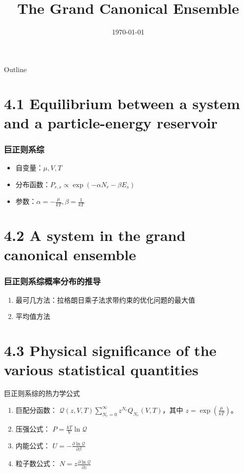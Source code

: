 \documentclass{ctexbeamer}
\title{The Grand Canonical Ensemble}
\date{\today}
\begin{document}
\begin{frame}
	\titlepage
\end{frame}
\begin{frame}{Outline}
    \tableofcontents
\end{frame}
\section{4.1 Equilibrium between 
a system and a particle-energy reservoir
}

\begin{frame}
\frametitle{巨正则系综}
\begin{itemize}
    \item 自变量：$\mu,V,T$
    \item 分布函数：$P_{r,s} \propto \exp(-\alpha N_r - \beta E_s)$
    \item 参数：$\alpha=-\frac{\mu}{kT}, \beta = \frac{1}{kT}$
\end{itemize}

\end{frame}
\section{4.2 A system in the grand canonical ensemble
}
\begin{frame}
    \frametitle{巨正则系综概率分布的推导}
    \begin{enumerate}
        \item 最可几方法：拉格朗日乘子法求带约束的优化问题的最大值
        \item 平均值方法
    \end{enumerate}
    
    \end{frame}
\section{4.3 Physical significance of the various
statistical quantities}
\begin{frame}{巨正则系综的热力学公式}
    \begin{enumerate}
        \item 巨配分函数：
        $\mathcal{Q}(z,V,T)
         \sum_{N_r=0}^{\infty}
         z^{N_r} Q_{N_r}(V,T)$，其中
         $z=\exp(\frac{\mu}{kT})$。
         \item 压强公式： $P=\frac{kT}{V} \ln \mathcal{Q}$
         \item 内能公式： $U=-\frac{\partial \ln \mathcal{Q}}{\partial \beta}$
         \item 粒子数公式：
         $N=z\frac{\partial \ln \mathcal{Q}}{\partial z}$
        \end{enumerate}
\end{frame}
\end{document}
